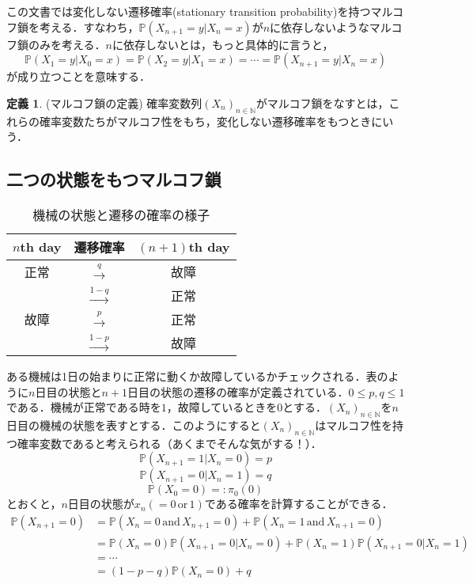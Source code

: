 \documentclass[12pt, a4paper]{jsarticle}
\theoremstyle{definition}
\newtheorem{defn}{定義}[section]
\newcommand{\NN}{{\mathbb{N}}} %
\begin{document}
この文書では変化しない遷移確率(stationary transition probability)を持つマルコフ鎖を考える．すなわち，$\mathbb{P}(X_{n+1} = y | X_n = x)$が$n$に依存しないようなマルコフ鎖のみを考える．$n$に依存しないとは，もっと具体的に言うと，
\[\mathbb{P}(X_{1} = y | X_0 = x) = \mathbb{P}(X_{2} = y | X_1 = x) = \cdots = \mathbb{P}(X_{n+1} = y | X_n = x)\]
が成り立つことを意味する．
\begin{screen}
	\begin{defn}(マルコフ鎖の定義)
		確率変数列$(X_n)_{n \in \NN}$がマルコフ鎖をなすとは，これらの確率変数たちがマルコフ性をもち，変化しない遷移確率をもつときにいう．
	\end{defn}
\end{screen}

\subsection{二つの状態をもつマルコフ鎖}
\begin{table}[h]
\caption{機械の状態と遷移の確率の様子}
\begin{center}
	\begin{tabular}{|c|c|c|} \hline
		$n$th day & 遷移確率 & $(n+1)$th day \\ \hline
		正常 & $\xrightarrow{q}$ & 故障 \\ \cline{2-3}
		\, & $\xrightarrow{1-q}$ & 正常 \\ \hline
		故障 & $\xrightarrow{p}$ & 正常 \\ \cline{2-3}
		\, & $\xrightarrow{1-p}$ & 故障 \\ \hline
	\end{tabular}
\end{center}

\end{table}
ある機械は1日の始まりに正常に動くか故障しているかチェックされる．表のように$n$日目の状態と$n+1$日目の状態の遷移の確率が定義されている．$0 \leq p,q \leq 1$である．機械が正常である時を$1$，故障しているときを$0$とする．$(X_n)_{n \in \NN}$を$n$日目の機械の状態を表すとする．このようにすると$(X_n)_{n \in \NN}$はマルコフ性を持つ確率変数であると考えられる（あくまでそんな気がする！）．
\[\mathbb{P}(X_{n+1} = 1|X_n = 0) = p\]
\[\mathbb{P}(X_{n+1} = 0|X_n = 1) = q\]
\[\mathbb{P}(X_0 = 0) =: \pi_0(0)\]
とおくと，$n$日目の状態が$x_n(=0 \, \text{or} \, 1)$である確率を計算することができる．
\begin{align*}
	\mathbb{P}(X_{n+1} = 0) &= \mathbb{P}(X_n = 0 \, \text{and}\, X_{n+1} = 0) + \mathbb{P}(X_n = 1 \, \text{and} \, X_{n+1} = 0) \\
	&= \mathbb{P}(X_n = 0)\mathbb{P}(X_{n+1} = 0 | X_{n} = 0) + \mathbb{P}(X_n = 1)\mathbb{P}(X_{n+1} = 0 | X_{n} = 1)\\
	&= \cdots \\
	&=(1-p-q)\mathbb{P}(X_n = 0) + q \\
\end{align*}
\end{document}
